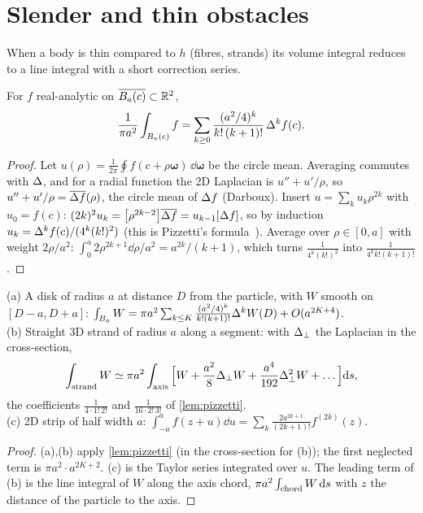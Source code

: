 \section{Slender and thin obstacles}\label{sec:slender}

When a body is thin compared to $h$ (fibres, strands) its volume integral reduces to a line integral with a short correction series.

\begin{lemma}\label{lem:pizzetti}
For $f$ real-analytic on $\overline{B_a(c)}\subset\mathbb{R}^2$,
\[
 \frac1{\pi a^2}\int_{B_a(c)}f=\sum_{k\ge0}\frac{(a^2/4)^k}{k!\,(k+1)!}\,\Delta^kf(c).
\]
\end{lemma}
\begin{proof}
Let $u(\rho)=\frac1{2\pi}\oint f(c+\rho\bm\omega)\,\dd\bm\omega$ be the circle mean. Averaging commutes with $\Delta$, and for a radial
function the 2D Laplacian is $u''+u'/\rho$, so $u''+u'/\rho=\overline{\Delta f}(\rho)$, the circle mean of $\Delta f$ (Darboux).
Insert $u=\sum_ku_k\rho^{2k}$ with $u_0=f(c)$: $(2k)^2u_k=\big[\rho^{2k-2}\big]\overline{\Delta f}=u_{k-1}[\Delta f]$, so by induction $u_k=\Delta^kf(c)/(4^k(k!)^2)$
(this is Pizzetti's formula~\cite{pizzetti1909}). Average over $\rho\in[0,a]$ with weight $2\rho/a^2$: $\int_0^a2\rho^{2k+1}\dd\rho/a^2=a^{2k}/(k+1)$, which turns $\frac{1}{4^k(k!)^2}$ into $\frac{1}{4^kk!(k+1)!}$.
\end{proof}

\begin{proposition}\label{prop:slender}
(a) A disk of radius $a$ at distance $D$ from the particle, with $W$ smooth on $[D-a,D+a]$:
$\int_{B_a}W=\pi a^2\sum_{k\le K}\frac{(a^2/4)^k}{k!(k+1)!}\Delta^kW(D)+O(a^{2K+4})$.\\
(b) Straight 3D strand of radius $a$ along a segment: with $\Delta_\perp$ the Laplacian in the cross-section,
\[
 \int_{\rm strand}W\simeq\pi a^2\int_{\rm axis}\Big[W+\frac{a^2}{8}\Delta_\perp W+\frac{a^4}{192}\Delta_\perp^2W+\dots\Big]\mathrm{d} s,
\]
the coefficients $\frac1{4\cdot1!\,2!}$ and $\frac1{16\cdot2!\,3!}$ of \cref{lem:pizzetti}.\\
(c) 2D strip of half width $a$: $\int_{-a}^a f(z+u)\dd u=\sum_k\frac{2a^{2k+1}}{(2k+1)!}f^{(2k)}(z)$.
\end{proposition}
\begin{proof}
(a),(b) apply \cref{lem:pizzetti} (in the cross-section for (b)); the first neglected term is $\pi a^2\cdot a^{2K+2}$. (c) is the Taylor series integrated
over $u$. The leading term of (b) is the line integral of $W$ along the axis chord, $\pi a^2\int_{\rm chord}W\,\mathrm{d} s$ with $z$ the distance of the particle to the axis. 
\end{proof}

